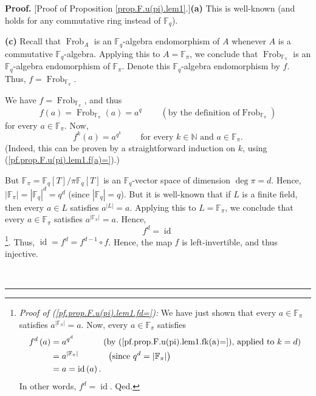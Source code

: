\documentclass[numbers=enddot,12pt,final,onecolumn,notitlepage]{scrartcl}%
\theoremstyle{definition}
\newenvironment{proof}[1][Proof]{\noindent\textbf{#1.} }{\ \rule{0.5em}{0.5em}}
\begin{document}
\begin{proof}
[Proof of Proposition \ref{prop.F.u(pi).lem1}.]\textbf{(a)} This is well-known
(and holds for any commutative ring instead of $\mathbb{F}_{q}$).

\textbf{(c)} Recall that $\operatorname*{Frob}\nolimits_{A}$ is an
$\mathbb{F}_{q}$-algebra endomorphism of $A$ whenever $A$ is a commutative
$\mathbb{F}_{q}$-algebra. Applying this to $A=\mathbb{F}_{\pi}$, we conclude
that $\operatorname*{Frob}\nolimits_{\mathbb{F}_{\pi}}$ is an $\mathbb{F}_{q}%
$-algebra endomorphism of $\mathbb{F}_{\pi}$. Denote this $\mathbb{F}_{q}%
$-algebra endomorphism by $f$. Thus, $f=\operatorname*{Frob}%
\nolimits_{\mathbb{F}_{\pi}}$.

We have $f=\operatorname*{Frob}\nolimits_{\mathbb{F}_{\pi}}$, and thus
\begin{equation}
f\left(  a\right)  =\operatorname*{Frob}\nolimits_{\mathbb{F}_{\pi}}\left(
a\right)  =a^{q}\ \ \ \ \ \ \ \ \ \ \left(  \text{by the definition of
}\operatorname*{Frob}\nolimits_{\mathbb{F}_{\pi}}\right)
\label{pf.prop.F.u(pi).lem1.f(a)=}%
\end{equation}
for every $a\in\mathbb{F}_{\pi}$. Now,%
\begin{equation}
f^{k}\left(  a\right)  =a^{q^{k}}\ \ \ \ \ \ \ \ \ \ \text{for every }%
k\in\mathbb{N}\text{ and }a\in\mathbb{F}_{\pi}.
\label{pf.prop.F.u(pi).lem1.fk(a)=}%
\end{equation}
(Indeed, this can be proven by a straightforward induction on $k$, using
(\ref{pf.prop.F.u(pi).lem1.f(a)=}).)

But $\mathbb{F}_{\pi}=\mathbb{F}_{q}\left[  T\right]  /\pi\mathbb{F}%
_{q}\left[  T\right]  $ is an $\mathbb{F}_{q}$-vector space of dimension
$\deg\pi=d$. Hence, $\left\vert \mathbb{F}_{\pi}\right\vert =\left\vert
\mathbb{F}_{q}\right\vert ^{d}=q^{d}$ (since $\left\vert \mathbb{F}%
_{q}\right\vert =q$). But it is well-known that if $L$ is a finite field, then
every $a\in L$ satisfies $a^{\left\vert L\right\vert }=a$. Applying this to
$L=\mathbb{F}_{\pi}$, we conclude that every $a\in\mathbb{F}_{\pi}$ satisfies
$a^{\left\vert \mathbb{F}_{\pi}\right\vert }=a$. Hence,%
\begin{equation}
f^{d}=\operatorname*{id} \label{pf.prop.F.u(pi).lem1.fd=}%
\end{equation}
\footnote{\textit{Proof of (\ref{pf.prop.F.u(pi).lem1.fd=}):} We have just
shown that every $a\in\mathbb{F}_{\pi}$ satisfies $a^{\left\vert
\mathbb{F}_{\pi}\right\vert }=a$. Now, every $a\in\mathbb{F}_{\pi}$ satisfies%
\begin{align*}
f^{d}\left(  a\right)   &  =a^{q^{d}}\ \ \ \ \ \ \ \ \ \ \left(  \text{by
(\ref{pf.prop.F.u(pi).lem1.fk(a)=}), applied to }k=d\right) \\
&  =a^{\left\vert \mathbb{F}_{\pi}\right\vert }\ \ \ \ \ \ \ \ \ \ \left(
\text{since }q^{d}=\left\vert \mathbb{F}_{\pi}\right\vert \right) \\
&  =a=\operatorname*{id}\left(  a\right)  .
\end{align*}
In other words, $f^{d}=\operatorname*{id}$. Qed.}. Thus, $\operatorname*{id}%
=f^{d}=f^{d-1}\circ f$. Hence, the map $f$ is left-invertible, and thus injective.


\end{proof}
\end{document}
